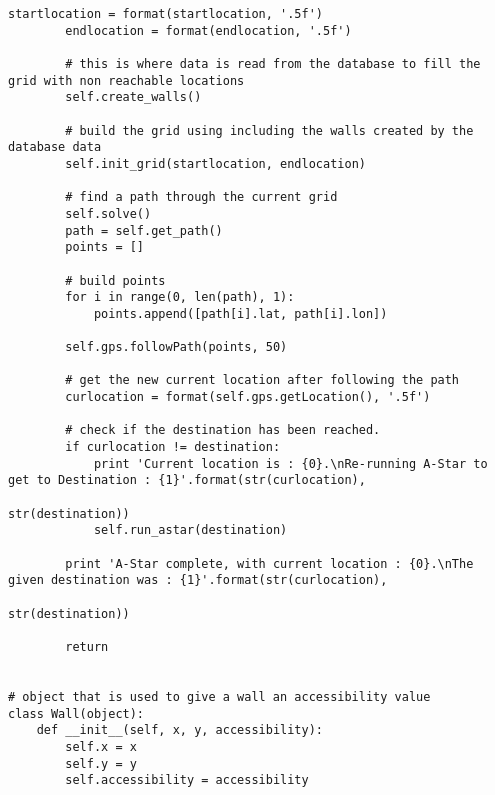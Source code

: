 \begin{lstlisting}[style=custompython, label=astar-code, caption=A-Star algorithm class code]
        startlocation = format(startlocation, '.5f')
        endlocation = format(endlocation, '.5f')

        # this is where data is read from the database to fill the grid with non reachable locations
        self.create_walls()

        # build the grid using including the walls created by the database data
        self.init_grid(startlocation, endlocation)

        # find a path through the current grid
        self.solve()
        path = self.get_path()
        points = []

        # build points
        for i in range(0, len(path), 1):
            points.append([path[i].lat, path[i].lon])

        self.gps.followPath(points, 50)

        # get the new current location after following the path
        curlocation = format(self.gps.getLocation(), '.5f')

        # check if the destination has been reached.
        if curlocation != destination:
            print 'Current location is : {0}.\nRe-running A-Star to get to Destination : {1}'.format(str(curlocation),
                                                                                                  str(destination))
            self.run_astar(destination)

        print 'A-Star complete, with current location : {0}.\nThe given destination was : {1}'.format(str(curlocation),
                                                                                                  str(destination))

        return


# object that is used to give a wall an accessibility value
class Wall(object):
    def __init__(self, x, y, accessibility):
        self.x = x
        self.y = y
        self.accessibility = accessibility
\end{lstlisting}
